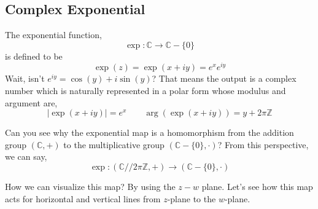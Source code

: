 \subsection{Complex Exponential}
The exponential function, $$\exp:\mathbb{C}\rightarrow\mathbb{C}-\{0\}$$
is defined to be $$\exp(z)=\exp(x+iy)=e^xe^{iy}$$
Wait, isn't $e^{iy}=\cos(y)+i\sin(y)$? That means the output is a complex number which is naturally represented in a polar form whose modulus and argument are,
$$\mid\exp(x+iy)\mid=e^x\qquad\operatorname{arg}(\exp(x+iy))=y+2\pi\mathbb{Z}$$
\begin{tcolorbox}
Can you see why the exponential map is a homomorphism from the addition group $(\mathbb{C},+)$ to the multiplicative group $(\mathbb{C}-\{0\},\cdot)$? From this perspective, we can say,
$$\exp:(\mathbb{C}//2\pi\mathbb Z,+)\rightarrow(\mathbb{C}-\{0\},\cdot)$$
\end{tcolorbox}
How we can visualize this map? By using the $z-w$ plane. Let's see how this map acts for horizontal and vertical lines from $z$-plane to the $w$-plane. 
